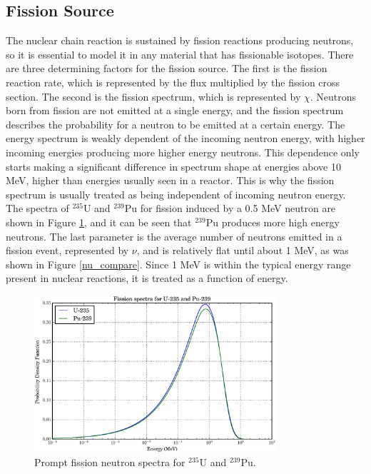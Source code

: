  \subsection{Fission Source}

The nuclear chain reaction is sustained by fission reactions producing neutrons, so it is essential to model it in any material that has fissionable isotopes.  There are three determining factors for the fission source.  The first is the fission reaction rate, which is represented by the flux multiplied by the fission cross section.  The second is the fission spectrum, which is represented by $\chi$.  Neutrons born from fission are not emitted at a single energy, and the fission spectrum describes the probability for a neutron to be emitted at a certain energy.  The energy spectrum is weakly dependent of the incoming neutron energy, with higher incoming energies producing more higher energy neutrons.  This dependence only starts making a significant difference in spectrum shape at energies above 10 MeV, higher than energies usually seen in a reactor.  This is why the fission spectrum is usually treated as being independent of incoming neutron energy.  The spectra of $^{235}$U and $^{239}$Pu for fission induced by a 0.5 MeV neutron are shown in Figure \ref{fiss_spec}, and it can be seen that $^{239}$Pu produces more high energy neutrons.  The last parameter is the average number of neutrons emitted in a fission event, represented by $\nu$, and is relatively flat until about 1 MeV, as was shown in Figure \ref{nu_compare}.  Since 1 MeV is within the typical energy range present in nuclear reactions, it is treated as a function of energy.

\begin{figure}[h!] 
  \centering
    \includegraphics[width=0.8\textwidth ]{graphics/fiss_spec.eps} 
     \caption{Prompt fission neutron spectra for $^{235}$U and $^{239}$Pu. \label{fiss_spec}}
\end{figure}

